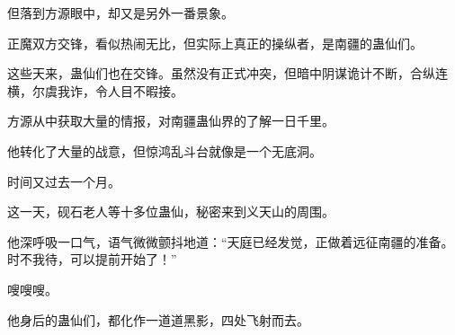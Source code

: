 \begin{this_body}
但落到方源眼中，却又是另外一番景象。

正魔双方交锋，看似热闹无比，但实际上真正的操纵者，是南疆的蛊仙们。

这些天来，蛊仙们也在交锋。虽然没有正式冲突，但暗中阴谋诡计不断，合纵连横，尔虞我诈，令人目不暇接。

方源从中获取大量的情报，对南疆蛊仙界的了解一日千里。

他转化了大量的战意，但惊鸿乱斗台就像是一个无底洞。

时间又过去一个月。

这一天，砚石老人等十多位蛊仙，秘密来到义天山的周围。

他深呼吸一口气，语气微微颤抖地道：“天庭已经发觉，正做着远征南疆的准备。时不我待，可以提前开始了！”

嗖嗖嗖。

他身后的蛊仙们，都化作一道道黑影，四处飞射而去。

\end{this_body}


